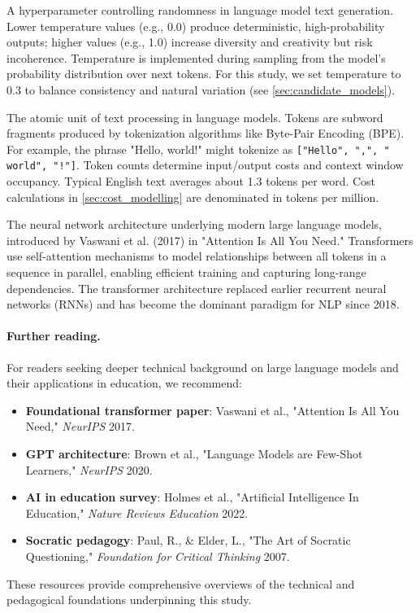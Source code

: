 \begin{description}[style=nextline,leftmargin=0em,itemsep=1em]
\item[\textbf{Temperature (Sampling Parameter)}] A hyperparameter controlling randomness in language model text generation. Lower temperature values (e.g., 0.0) produce deterministic, high-probability outputs; higher values (e.g., 1.0) increase diversity and creativity but risk incoherence. Temperature is implemented during sampling from the model's probability distribution over next tokens. For this study, we set temperature to 0.3 to balance consistency and natural variation (see \cref{sec:candidate_models}).

\item[\textbf{Token}] The atomic unit of text processing in language models. Tokens are subword fragments produced by tokenization algorithms like Byte-Pair Encoding (BPE). For example, the phrase "Hello, world!" might tokenize as \texttt{["Hello", ",", " world", "!"]}. Token counts determine input/output costs and context window occupancy. Typical English text averages about 1.3 tokens per word. Cost calculations in \cref{sec:cost_modelling} are denominated in tokens per million.

\item[\textbf{Transformer Architecture}] The neural network architecture underlying modern large language models, introduced by Vaswani et al. (2017) in "Attention Is All You Need." Transformers use self-attention mechanisms to model relationships between all tokens in a sequence in parallel, enabling efficient training and capturing long-range dependencies. The transformer architecture replaced earlier recurrent neural networks (RNNs) and has become the dominant paradigm for NLP since 2018.

\end{description}

\paragraph{Further reading.} For readers seeking deeper technical background on large language models and their applications in education, we recommend:
\begin{itemize}
\item \textbf{Foundational transformer paper}: Vaswani et al., "Attention Is All You Need," \textit{NeurIPS} 2017.
\item \textbf{GPT architecture}: Brown et al., "Language Models are Few-Shot Learners," \textit{NeurIPS} 2020.
\item \textbf{AI in education survey}: Holmes et al., "Artificial Intelligence In Education," \textit{Nature Reviews Education} 2022.
\item \textbf{Socratic pedagogy}: Paul, R., \& Elder, L., "The Art of Socratic Questioning," \textit{Foundation for Critical Thinking} 2007.
\end{itemize}

These resources provide comprehensive overviews of the technical and pedagogical foundations underpinning this study.
